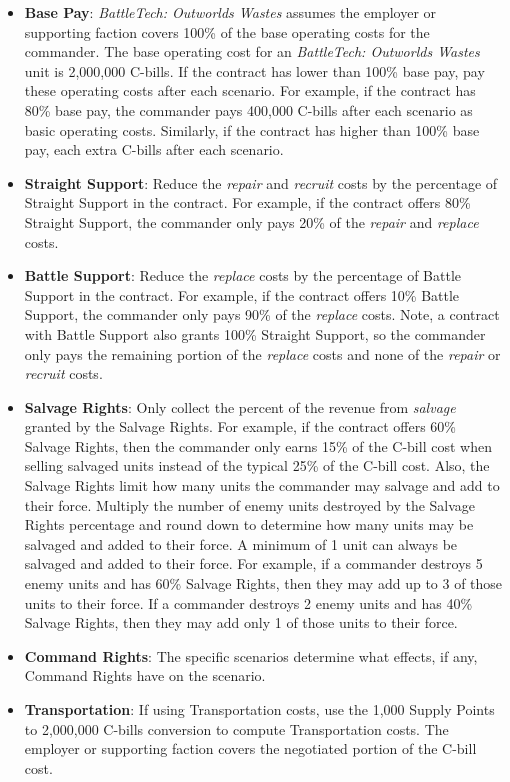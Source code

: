 \begin{itemize}

\item {\bfseries Base Pay}: \emph{BattleTech: Outworlds Wastes} assumes the employer or supporting faction covers 100\% of the base operating costs for the commander.
The base operating cost for an \emph{BattleTech: Outworlds Wastes} unit is 2,000,000 C-bills.
If the contract has lower than 100\% base pay, pay these operating costs after each scenario.
For example, if the contract has 80\% base pay, the commander pays 400,000 C-bills after each scenario as basic operating costs.
Similarly, if the contract has higher than 100\% base pay, each extra C-bills after each scenario.

\item {\bfseries Straight Support}: Reduce the \emph{repair} and \emph{recruit} costs by the percentage of Straight Support in the contract.
For example, if the contract offers 80\% Straight Support, the commander only pays 20\% of the \emph{repair} and \emph{replace} costs.

\item {\bfseries Battle Support}: Reduce the \emph{replace} costs by the percentage of Battle Support in the contract.
For example, if the contract offers 10\% Battle Support, the commander only pays 90\% of the \emph{replace} costs.
Note, a contract with Battle Support also grants 100\% Straight Support, so the commander only pays the remaining portion of the \emph{replace} costs and none of the \emph{repair} or \emph{recruit} costs.

\item {\bfseries Salvage Rights}: Only collect the percent of the revenue from \emph{salvage} granted by the Salvage Rights.
For example, if the contract offers 60\% Salvage Rights, then the commander only earns 15\% of the C-bill cost when selling salvaged units instead of the typical 25\% of the C-bill cost.
Also, the Salvage Rights limit how many units the commander may salvage and add to their force.
Multiply the number of enemy units destroyed by the Salvage Rights percentage and round down to determine how many units may be salvaged and added to their force.
A minimum of 1 unit can always be salvaged and added to their force.
For example, if a commander destroys 5 enemy units and has 60\% Salvage Rights, then they may add up to 3 of those units to their force.
If a commander destroys 2 enemy units and has 40\% Salvage Rights, then they may add only 1 of those units to their force.

\item {\bfseries Command Rights}: The specific scenarios determine what effects, if any, Command Rights have on the scenario.

\item {\bfseries Transportation}: If using Transportation costs, use the 1,000 Supply Points to 2,000,000 C-bills conversion to compute Transportation costs.
The employer or supporting faction covers the negotiated portion of the C-bill cost.

\end{itemize}

